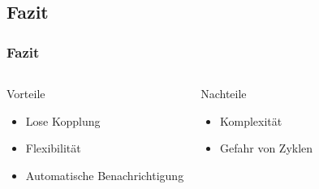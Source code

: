 

\subsection{Fazit}
\begin{frame}
	\frametitle{Fazit}
	\begin{columns} 
    		\begin{exampleblock}{Vorteile}
    			\begin{itemize}
    				\item Lose Kopplung
    				\item Flexibilität
    				\item Automatische Benachrichtigung
    			\end{itemize}
    		\end{exampleblock}
    		\begin{alertblock}{Nachteile}
    			\begin{itemize}
    				\item Komplexität
    				\item Gefahr von Zyklen
    			\end{itemize}
    		\end{alertblock}
  	\end{columns}   	  		
\end{frame}